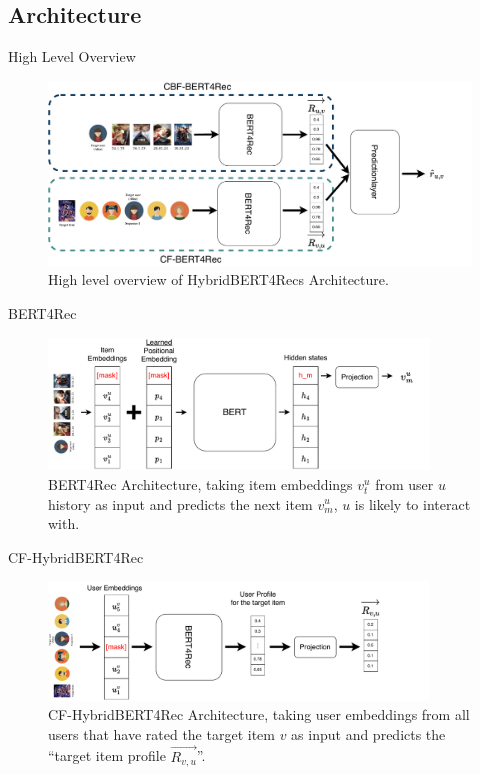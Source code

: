 \documentclass[en]{sdqbeamer}
\begin{document}
\subsection{Architecture}
\begin{frame}{High Level Overview}
	\begin{figure}
		\includegraphics[height=0.6\textheight]{images/hybridBERT4Rec_high_level.pdf}
		\caption{High level overview of HybridBERT4Recs Architecture. \cite{channarongHybridBERT4RecHybridContentBased2022}}
	\end{figure}
\end{frame}
\begin{frame}{BERT4Rec \cite{sunBERT4RecSequentialRecommendation2019}}
	\begin{figure}
		\includegraphics[width=0.9\textwidth]{images/BERT4Rec.pdf}
		\caption{BERT4Rec Architecture, taking item embeddings $v_t^u$ from user $u$ history as input and predicts the next item $v_m^u$, $u$ is likely to interact with. \cite{sunBERT4RecSequentialRecommendation2019}}
	\end{figure}
\end{frame}
\begin{frame}{CF-HybridBERT4Rec}
	\begin{figure}
		\includegraphics[width=0.9\textwidth]{images/CF-HybridBERT4Rec.pdf}
		\caption{CF-HybridBERT4Rec Architecture, taking user embeddings from all users that have rated the target item $v$ as input and predicts the \enquote{target item profile $\overrightarrow{R_{v,u}}$}. \cite{channarongHybridBERT4RecHybridContentBased2022}}
	\end{figure}
\end{frame}
\end{document}
